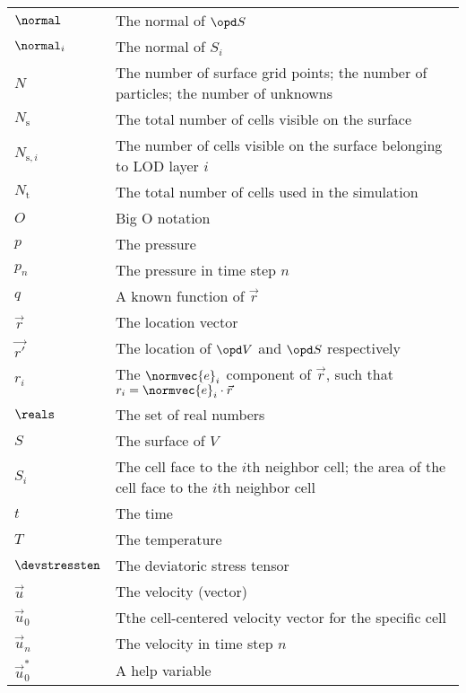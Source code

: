 {\begin{center}
\begin{longtabu}{l X}
    $\normal$           & The normal of $\opd S$ \\
    $\normal_i$         & The normal of $S_i$ \\
    $N$                 & The number of surface grid points; the number of particles;
                          the number of unknowns \\
    $N_{\text{s}}$      & The total number of cells visible on the surface \\
    $N_{\text{s},i}$    & The number of cells visible on the surface belonging to LOD layer $i$ \\
    $N_{\text{t}}$      & The total number of cells used in the simulation \\
    $O$                 & Big O notation \\
    $p$                 & The pressure \\
    $p_n$               & The pressure in time step $n$ \\
    $q$                 & A known function of $\vec{r}$ \\
    $\vec{r}$           & The location vector \\
    $\vec{r'}$          & The location of $\opd V$ and $\opd S$ respectively \\
    $r_i$               & The $\normvec{e}_i$ component of $\vec{r}$,
                          such that $r_i = \normvec{e}_i\cdot\vec{r}$ \\
    $\reals$            & The set of real numbers \\
    $S$                 & The surface of $V$ \\
    $S_i$               & The cell face to the $i$th neighbor cell;
                          the area of the cell face to the $i$th neighbor cell \\
    $t$                 & The time \\
    $T$                 & The temperature \\
    $\devstressten$     & The deviatoric stress tensor \\
    $\vec{u}$           & The velocity (vector) \\
    $\vec{u}_0$         & Tthe cell-centered velocity vector for the specific cell \\
    $\vec{u}_n$         & The velocity in time step $n$ \\
    $\vec{u}_0^*$       & A help variable \\

\end{longtabu}
\end{center}}
